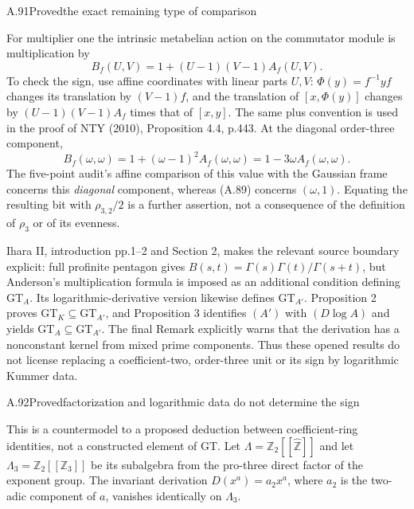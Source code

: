 \begin{statement}{A.91}{Proved}{the exact remaining type of comparison}
\citep[Proposition 4.4]{LitNakamuraTsunogaiYasuda2010} \citep[Introduction and Section 2]{LitIhara2000BetaGammaII}
\end{statement}
For multiplier one the intrinsic metabelian action on the
commutator module is multiplication by
\[
 B_f(U,V)=1+(U-1)(V-1)A_f(U,V).
\]
To check the sign, use affine coordinates with linear parts $U,V$:
$\Phi(y)=f^{-1}yf$ changes its translation by $(V-1)f$,
and the translation of $[x,\Phi(y)]$ changes by
$(U-1)(V-1)A_f$ times that of $[x,y]$.
The same plus convention is used in the proof of NTY (2010),
Proposition 4.4, p.443.  At the diagonal order-three component,
\[
 B_f(\omega,\omega)
   =1+ (\omega-1)^2A_f(\omega,\omega)
   =1-3\omega A_f(\omega,\omega).
\]
The five-point audit's affine comparison of this value with the
Gaussian frame concerns this \emph{diagonal} component, whereas
(A.89) concerns $(\omega,1)$.  Equating the resulting bit with
$\rho_{3,2}/2$ is a further assertion, not a consequence of the
definition of $\rho_3$ or of its evenness.

Ihara II, introduction pp.1--2 and Section 2, makes the relevant
source boundary explicit: full profinite pentagon gives
$B(s,t)=\Gamma(s)\Gamma(t)/\Gamma(s+t)$, but Anderson's
multiplication formula is imposed as an additional condition
defining $\mathrm{GT}_A$.  Its logarithmic-derivative version
likewise defines $\mathrm{GT}_{A'}$.  Proposition 2 proves
$\mathrm{GT}_K\subseteq\mathrm{GT}_{A'}$, and Proposition 3
identifies $(A')$ with $(D\log A)$ and yields
$\mathrm{GT}_A\subseteq\mathrm{GT}_{A'}$.
The final Remark explicitly warns that the derivation has a
nonconstant kernel from mixed prime components.  Thus these
opened results do not license replacing a coefficient-two,
order-three unit or its sign by logarithmic Kummer data.

\begin{statement}{A.92}{Proved}{factorization and logarithmic data do not determine the sign}
\end{statement}
This is a countermodel to a proposed deduction between coefficient-ring
identities, not a constructed element of GT.
Let $\Lambda=\mathbb Z_2[[\widehat{\mathbb Z}]]$ and let
$\Lambda_3=\mathbb Z_2[[\mathbb Z_3]]$ be its subalgebra from
the pro-three direct factor of the exponent group.  The invariant
derivation $D(x^a)=a_2x^a$, where $a_2$ is the two-adic component
of $a$, vanishes identically on $\Lambda_3$.

